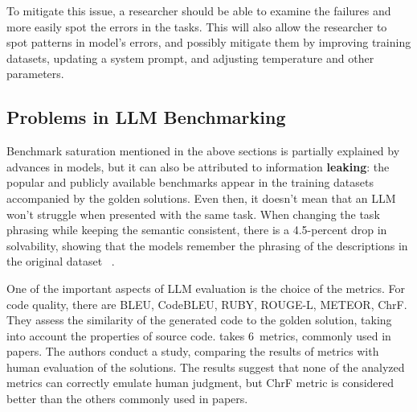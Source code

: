 To mitigate this issue, a researcher should be able to examine the failures and more easily spot the errors in the tasks.
This will also allow the researcher to spot patterns in model's errors, and possibly mitigate them by improving training datasets, updating a system prompt, and adjusting temperature and other parameters.

\subsection{Problems in LLM Benchmarking}



Benchmark saturation mentioned in the above sections is partially explained by advances in models, but it can also be attributed to information \textbf{leaking}: the popular and publicly available benchmarks appear in the training datasets accompanied by the golden solutions.
Even then, it doesn't mean that an LLM won't struggle when presented with the same task.
When changing the task phrasing while keeping the semantic consistent, there is a 4.5-percent drop in solvability, showing that the models remember the phrasing of the descriptions in the original dataset~ \cite{uniyal2024one}.

One of the important aspects of LLM evaluation is the choice of the metrics.
For code quality, there are BLEU, CodeBLEU, RUBY, ROUGE-L, METEOR, ChrF\@.
They assess the similarity of the generated code to the golden solution, taking into account the properties of source code.
\cite{evtikhiev2023out} takes 6~metrics, commonly used in papers.
The authors conduct a study, comparing the results of metrics with human evaluation of the solutions.
The results suggest that none of the analyzed metrics can correctly emulate human judgment, but ChrF metric is considered better than the others commonly used in papers.

